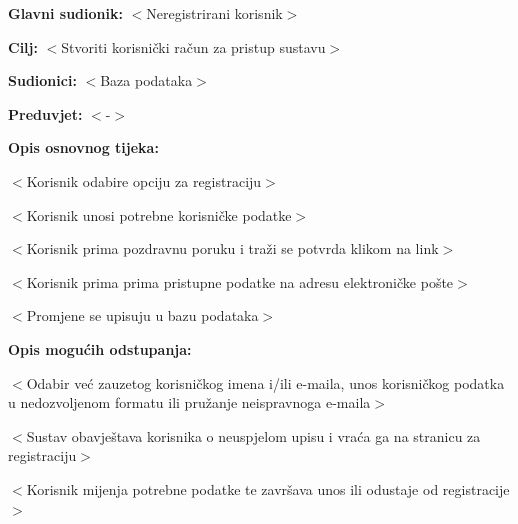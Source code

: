 	\noindent {}
	\begin{packed_item}
		
		\item \textbf{Glavni sudionik: }$<$Neregistrirani korisnik$>$
		\item  \textbf{Cilj:} $<$Stvoriti korisnički račun za pristup sustavu$>$
		\item  \textbf{Sudionici:} $<$Baza podataka$>$
		\item  \textbf{Preduvjet:} $<$-$>$
		\item  \textbf{Opis osnovnog tijeka:}
		
		\item[] \begin{packed_enum}
			
			\item $<$Korisnik odabire opciju za registraciju$>$
			\item $<$Korisnik unosi potrebne korisničke podatke$>$
			\item $<$Korisnik prima pozdravnu poruku i traži se potvrda klikom na link$>$
			\item $<$Korisnik prima prima pristupne podatke na adresu elektroničke pošte$>$
			\item $<$Promjene se upisuju u bazu podataka$>$
		\end{packed_enum}
		
		\item  \textbf{Opis mogućih odstupanja:}
		
		\item[] \begin{packed_item}
			
			\item[2.a] $<$Odabir već zauzetog korisničkog imena i/ili e-maila, unos korisničkog podatka u nedozvoljenom formatu ili pružanje neispravnoga e-maila$>$
			\item[] \begin{packed_enum}
				
				\item $<$Sustav obavještava korisnika o neuspjelom upisu i vraća ga na stranicu za registraciju$>$
				\item $<$Korisnik mijenja potrebne podatke te završava unos ili odustaje od registracije$>$
				
			\end{packed_enum}
			
		\end{packed_item}
	\end{packed_item}
	
